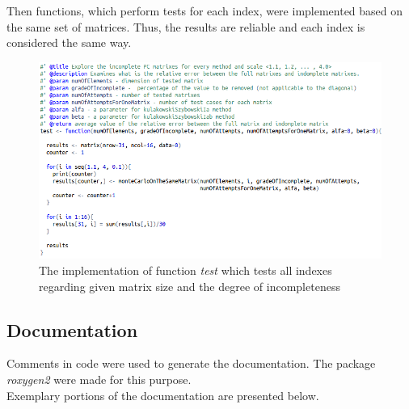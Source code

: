 Then functions, which perform tests for each index, were implemented based on the same set of matrices. Thus, the results are reliable and each index is considered the same way.

\begin{figure}[h]
\centerline{\includegraphics[scale=0.58]{images/kod22.png}}
\caption{The implementation of function \textit{test} which tests all indexes regarding given matrix size and the degree of incompleteness}
\label{fig:rstudio}
\end{figure}


\subsection{Documentation}
Comments in code were used to generate the documentation. The package \textit{roxygen2} were made for this purpose. \\ Exemplary portions of the documentation are presented below.

